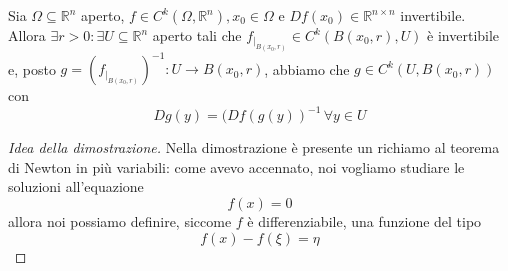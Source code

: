 \begin{theorem}
Sia $\Omega \subseteq \mathbb{R}^n$ aperto, $f \in C^k(\Omega, \mathbb{R}^n), x_0 \in \Omega$ e $Df(x_0) \in \mathbb{R}^{n \times n}$ invertibile. \\
Allora $\exists r > 0: \exists U \subseteq \mathbb{R}^n$ aperto tali che $f_{|_{B(x_0, r)}} \in C^{k}(B(x_0, r), U)$ è invertibile e, posto $g=(f_{|_{B(x_0, r)}})^{-1}:U \to B(x_0, r)$, abbiamo che
$g \in C^k(U, B(x_0, r))$ con
$$
Dg(y) = (Df(g(y))^{-1} \, \forall y \in U
$$
\begin{proof}[Idea della dimostrazione]
Nella dimostrazione è presente un richiamo al teorema di Newton in più variabili: come avevo accennato, noi vogliamo studiare le soluzioni all'equazione 
$$
f(x) = 0
$$
allora noi possiamo definire, siccome $f$ è differenziabile, una funzione del tipo
$$
f(x) - f(\xi) = \eta
$$
\end{proof}

\end{theorem}
